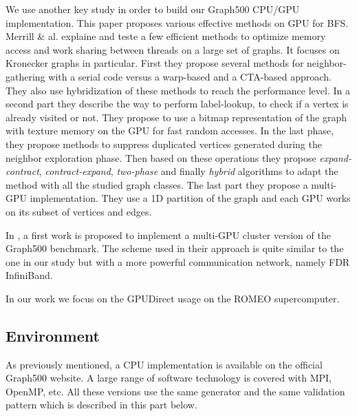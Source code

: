 We use another key study in order to build our Graph500 CPU/GPU implementation. 
This paper \cite{merrill2015high} proposes various effective methods on GPU for BFS. 
Merrill \& al. explaine and teste a few efficient methods to optimize memory access and work sharing between threads on a large set of graphs. 
It focuses on Kronecker graphs in particular. 
First they propose several methods for neighbor-gathering with a serial code versus a warp-based and a CTA-based approach. 
They also use hybridization of these methods to reach the performance level. 
In a second part they describe the way to perform label-lookup, to check if a vertex is already visited or not. 
They propose to use a bitmap representation of the graph with texture memory on the GPU for fast random accesses. 
In the last phase, they propose methods to suppress duplicated vertices generated during the neighbor exploration phase. 
Then based on these operations they propose \textit{expand-contract}, \textit{contract-expand}, \textit{two-phase} and finally \textit{hybrid} algorithms to adapt the method with all the studied graph classes.
The last part they propose a multi-GPU implementation.
They use a 1D partition of the graph and each GPU works on its subset of vertices and edges. 

In \cite{fu2014parallel}, a first work is proposed to implement a multi-GPU cluster version of the Graph500 benchmark. 
The scheme used in their approach is quite similar to the one in our study but with a more powerful communication network, namely FDR InfiniBand. 

In our work we focus on the GPUDirect usage on the ROMEO supercomputer. 

\subsection{Environment}
As previously mentioned, a CPU implementation is available on the official Graph500 website. 
A large range of software technology is covered with MPI, OpenMP, etc. 
All these versions use the same generator and the same validation pattern which is described in this part below. 

